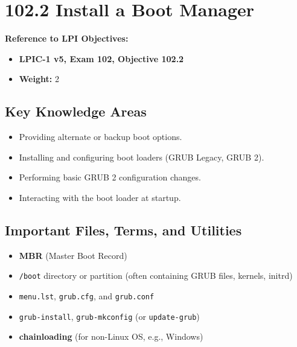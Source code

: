 \documentclass[12pt,a4paper]{report}
\begin{document}



\newpage

\section*{102.2 Install a Boot Manager}

\textbf{Reference to LPI Objectives:}  
\begin{itemize}
    \item \textbf{LPIC-1 v5, Exam 102, Objective 102.2}  
    \item \textbf{Weight:} 2  
\end{itemize}

\subsection*{Key Knowledge Areas}
\begin{itemize}
    \item Providing alternate or backup boot options.  
    \item Installing and configuring boot loaders (GRUB Legacy, GRUB 2).  
    \item Performing basic GRUB 2 configuration changes.  
    \item Interacting with the boot loader at startup.
\end{itemize}

\subsection*{Important Files, Terms, and Utilities}
\begin{itemize}
    \item \textbf{MBR} (Master Boot Record)  
    \item \texttt{/boot} directory or partition (often containing GRUB files, kernels, initrd)  
    \item \texttt{menu.lst}, \texttt{grub.cfg}, and \texttt{grub.conf}  
    \item \texttt{grub-install}, \texttt{grub-mkconfig} (or \texttt{update-grub})  
    \item \textbf{chainloading} (for non-Linux OS, e.g., Windows)
\end{itemize}
\end{document}
